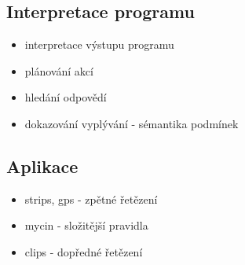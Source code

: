 \subsection{Interpretace programu}
\begin{framed}
  \begin{itemize}
    \item interpretace výstupu programu
    \item plánování akcí
    \item hledání odpovědí
    \item dokazování vyplývání - sémantika podmínek
  \end{itemize}
\end{framed}

\subsection{Aplikace}
\begin{framed}
  \begin{itemize}
    \item strips, gps - zpětné řetězení
    \item mycin - složitější pravidla
    \item clips - dopředné řetězení
  \end{itemize}
\end{framed}

